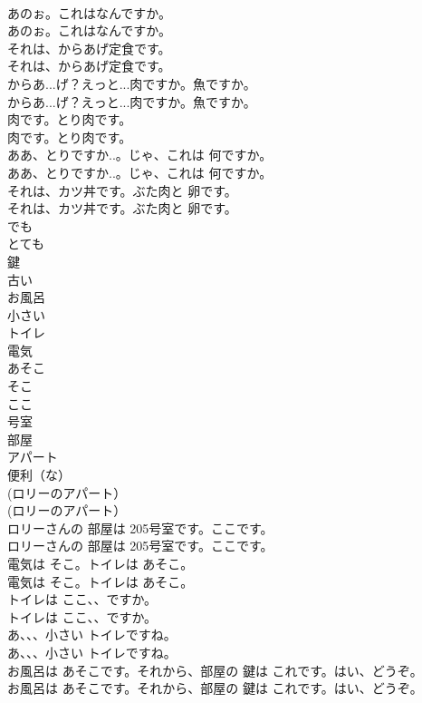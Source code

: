 \documentclass[8pt]{extreport}
\begin{document}
\begin{CJK}{UTF8}{min}
\\	あのぉ。これはなんですか。	
\\	あのぉ。これはなんですか。 
\\	それは、からあげ定食です。	
\\	それは、からあげ定食です。 
\\	からあ...げ？えっと...肉ですか。魚ですか。	
\\	からあ...げ？えっと...肉ですか。魚ですか。 
\\	肉です。とり肉です。	
\\	肉です。とり肉です。 
\\	ああ、とりですか..。じゃ、これは 何ですか。	
\\	ああ、とりですか..。じゃ、これは 何ですか。 
\\	それは、カツ丼です。ぶた肉と 卵です。	
\\	それは、カツ丼です。ぶた肉と 卵です。 
\\	でも
\\	とても
\\	鍵
\\	古い
\\	お風呂
\\	小さい
\\	トイレ
\\	電気
\\	あそこ
\\	そこ
\\	ここ
\\	号室
\\	部屋
\\	アパート
\\	便利（な）
\\	(ロリーのアパート）	
\\	(ロリーのアパート） 
\\	ロリーさんの 部屋は 205号室です。ここです。	
\\	ロリーさんの 部屋は 205号室です。ここです。 
\\	電気は そこ。トイレは あそこ。	
\\	電気は そこ。トイレは あそこ。 
\\	トイレは ここ、、ですか。	
\\	トイレは ここ、、ですか。 
\\	あ、、、小さい トイレですね。	
\\	あ、、、小さい トイレですね。 
\\	お風呂は あそこです。それから、部屋の 鍵は これです。はい、どうぞ。	
\\	お風呂は あそこです。それから、部屋の 鍵は これです。はい、どうぞ。 

\end{CJK}
\end{document}
